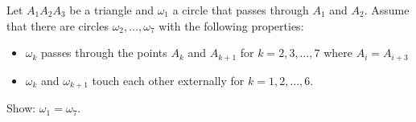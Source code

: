 Let $A_{1}A_{2}A_{3}$ be a triangle and $\omega_1$ a circle that passes through $A_1$ and $A_2$.
Assume that there are circles $\omega_2, \ldots, \omega_7$ with the following properties:
\begin{itemize}
    \item $\omega_k$ passes through the points $A_k$ and $A_{k+1}$ for $k=2,3, \ldots, 7$ where $A_i=A_{i+3}$
    \item $\omega_k$ and $\omega_{k+1}$ touch each other externally for $k=1,2, \ldots, 6$.
\end{itemize}
Show: $\omega_1=\omega_7$.
